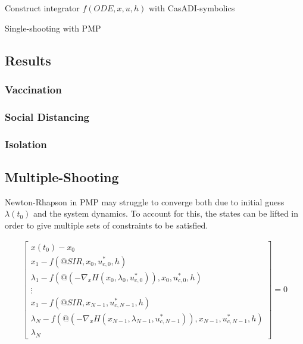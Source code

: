 \begin{algorithm}[H]
\SetAlgoLined
{}
Construct integrator $f(ODE, x, u, h)$ with CasADI-symbolics\\
 \caption{Single-shooting with PMP}
 \label{alg:SingleShooting_Integration_PMP}
\end{algorithm}

\subsection{Results}
\subsubsection{Vaccination}
\subsubsection{Social Distancing}
\subsubsection{Isolation}

\subsection{Multiple-Shooting}
Newton-Rhapson in PMP may struggle to converge both due to initial guess $\lambda(t_0)$ and the system dynamics. To account for this, the states can be lifted in order to give multiple sets of constraints to be satisfied.

\begin{align}
    \begin{bmatrix}
    x(t_0) - x_0\\
    x_1 - f(@SIR, x_0, u^*_{c, 0}, h)\\
    \lambda_1 - f(@(-\nabla_xH(x_0, \lambda_0, u^*_{c,0})), x_0, u^*_{c,0}, h)\\
    \vdots\\
    x_1 - f(@SIR, x_{N-1}, u^*_{c, N-1}, h)\\
    \lambda_N - f(@(-\nabla_xH(x_{N-1}, \lambda_{N-1}, u^*_{c,{N-1}})), x_{N-1}, u^*_{c,N-1}, h)\\
    \lambda_N
    \end{bmatrix} = 0
\end{align}

